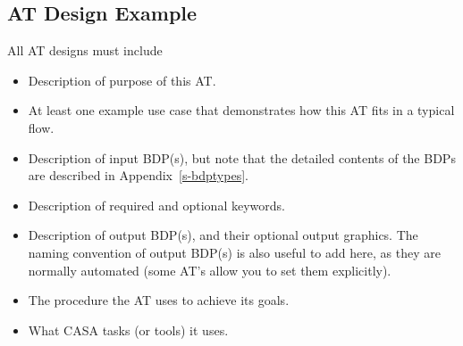 \subsection{AT Design Example}

All AT designs must include
\begin{itemize}
\item Description of purpose of this AT.
\item At least one example use case that demonstrates how this AT
      fits in a typical flow.
\item Description of input BDP(s), but note that the detailed contents of the BDPs are described
in Appendix~\ref{s-bdptypes}.
\item Description of required and optional keywords.
\item Description of output BDP(s), and their optional output graphics. The 
naming convention of output BDP(s) is also useful to add here, as they 
are normally automated (some AT's allow you to set them explicitly).
\item The procedure the AT uses to achieve its goals.
\item What CASA tasks (or tools) it uses.
\end{itemize}
\clearpage
